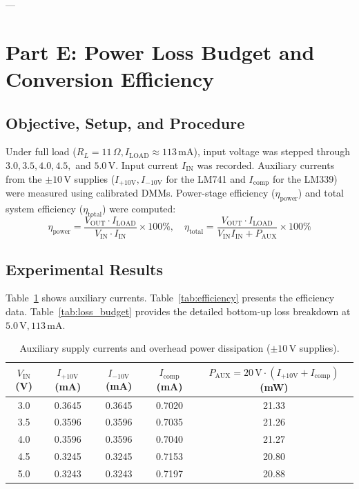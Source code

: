 \documentclass[11pt,a4paper]{article}
\begin{document}
---

\section{Part E: Power Loss Budget and Conversion Efficiency}

\subsection{Objective, Setup, and Procedure}
Under full load ($R_L = 11\,\Omega, I_{\mathrm{LOAD}} \approx 113\,\mathrm{mA}$), input voltage was stepped through $3.0, 3.5, 4.0, 4.5,$ and $5.0\,\mathrm{V}$. Input current $I_{\mathrm{IN}}$ was recorded. Auxiliary currents from the $\pm 10\,\mathrm{V}$ supplies ($I_{+10\mathrm{V}}, I_{-10\mathrm{V}}$ for the LM741 and $I_{\mathrm{comp}}$ for the LM339) were measured using calibrated DMMs. Power-stage efficiency ($\eta_{\mathrm{power}}$) and total system efficiency ($\eta_{\mathrm{total}}$) were computed:
\begin{equation}
    \eta_{\mathrm{power}} = \frac{V_{\mathrm{OUT}} \cdot I_{\mathrm{LOAD}}}{V_{\mathrm{IN}} \cdot I_{\mathrm{IN}}} \times 100\%, \quad \eta_{\mathrm{total}} = \frac{V_{\mathrm{OUT}} \cdot I_{\mathrm{LOAD}}}{V_{\mathrm{IN}} I_{\mathrm{IN}} + P_{\mathrm{AUX}}} \times 100\%
\end{equation}

\subsection{Experimental Results}
Table~\ref{tab:aux_currents} shows auxiliary currents. Table~\ref{tab:efficiency} presents the efficiency data. Table~\ref{tab:loss_budget} provides the detailed bottom-up loss breakdown at $5.0\,\mathrm{V}, 113\,\mathrm{mA}$.

\begin{table}[H]
\centering
\caption{Auxiliary supply currents and overhead power dissipation ($\pm 10\,\mathrm{V}$ supplies).}
\label{tab:aux_currents}
\begin{tabular}{@{}ccccc@{}}
\toprule
\textbf{$V_{\mathrm{IN}}$ (V)} & \textbf{$I_{+10\mathrm{V}}$ (mA)} & \textbf{$I_{-10\mathrm{V}}$ (mA)} & \textbf{$I_{\mathrm{comp}}$ (mA)} & \textbf{$P_{\mathrm{AUX}} = 20\,\mathrm{V} \cdot (I_{+10\mathrm{V}} + I_{\mathrm{comp}})$ (mW)} \\ \midrule
3.0 & 0.3645 & 0.3645 & 0.7020 & 21.33 \\
3.5 & 0.3596 & 0.3596 & 0.7035 & 21.26 \\
4.0 & 0.3596 & 0.3596 & 0.7040 & 21.27 \\
4.5 & 0.3245 & 0.3245 & 0.7153 & 20.80 \\
5.0 & 0.3243 & 0.3243 & 0.7197 & 20.88 \\
\bottomrule
\end{tabular}
\end{table}
\end{document}
